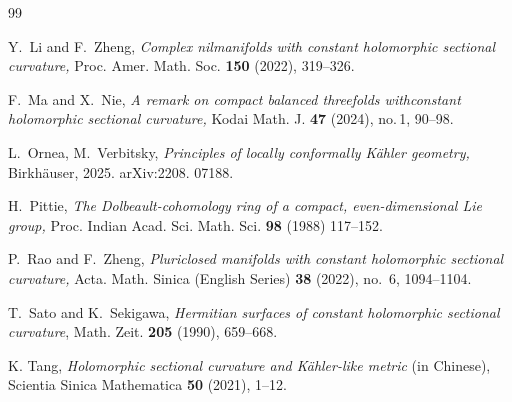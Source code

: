 \documentclass{amsart}
\numberwithin{equation}{section}
\begin{document}
\begin{thebibliography}{99}






 Y.~Li and F.~Zheng, \emph{Complex nilmanifolds with constant holomorphic sectional curvature,}  Proc. Amer. Math. Soc. {\bf 150} (2022), 319--326.

 F.~Ma and X.~Nie, \emph{A remark on compact balanced threefolds withconstant holomorphic sectional curvature,} Kodai Math. J. {\bf 47} (2024), no.\,1, 90--98.



 L.~Ornea, M.~Verbitsky, \emph{Principles of locally conformally K\"ahler geometry,} Birkh\"auser, 2025. arXiv:2208. 07188.



 H.~Pittie, \emph{The Dolbeault-cohomology ring of a compact, even-dimensional Lie group,} Proc. Indian Acad. Sci. Math. Sci. {\bf 98} (1988) 117--152.


 P.~Rao and F.~Zheng, \emph{ Pluriclosed manifolds with constant holomorphic sectional curvature,} Acta. Math. Sinica (English Series) {\bf 38} (2022), no.~6, 1094--1104.


 T.~Sato and K.~Sekigawa, \emph{Hermitian surfaces of constant holomorphic sectional curvature}, Math. Zeit. \textbf{205} (1990), 659--668.



 K. Tang, \emph{Holomorphic sectional curvature and K\"ahler-like metric} (in Chinese),  Scientia Sinica Mathematica {\bf 50} (2021), 1--12.





\end{thebibliography}
\end{document}
